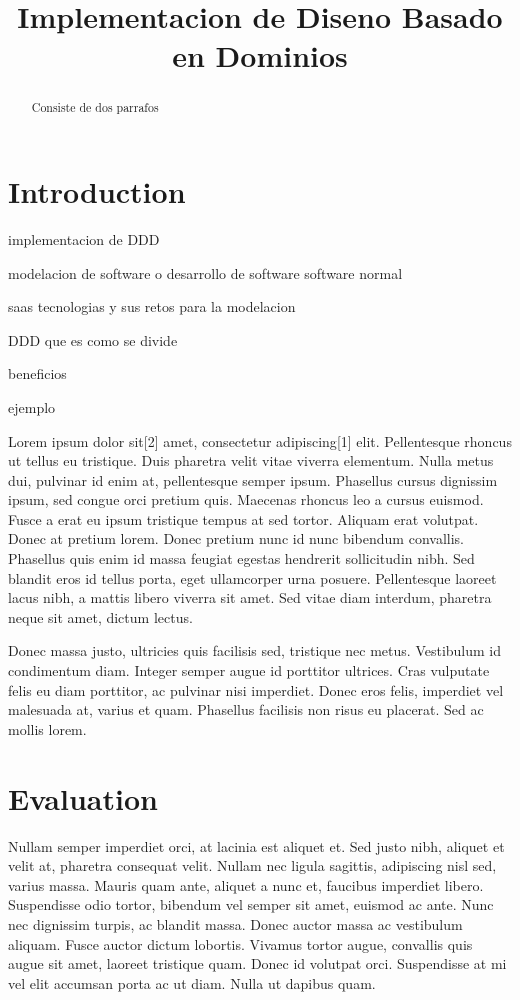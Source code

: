 \documentclass{acm_proc_article-sp}
\title{Implementacion de Diseno Basado en Dominios}
\author{
\alignauthor Christian Eder Gastelum Reyes \\
        \affaddr{Universidad Autonoma de Cuidad Juarez}\\
       \email{\href{mailto:cristian_eder@hotmail.com}{\nolinkurl{cristian\_eder@hotmail.com}}}
\and \alignauthor Ramon Parra Loera \\
        \affaddr{Universidad Autonoma de Cuidad Juarez}\\
       \email{\href{mailto:rparra@uacj.mx}{\nolinkurl{rparra@uacj.mx}}}
\and }
\date{}
\begin{document}
\maketitle

\begin{abstract}
Consiste de dos parrafos
\end{abstract}

\section{Introduction}\label{introduction}

implementacion de DDD

modelacion de software o desarrollo de software software normal

saas tecnologias y sus retos para la modelacion

DDD que es como se divide

beneficios

ejemplo

Lorem ipsum dolor sit{[}2{]} amet, consectetur adipiscing{[}1{]} elit.
Pellentesque rhoncus ut tellus eu tristique. Duis pharetra velit vitae
viverra elementum. Nulla metus dui, pulvinar id enim at, pellentesque
semper ipsum. Phasellus cursus dignissim ipsum, sed congue orci pretium
quis. Maecenas rhoncus leo a cursus euismod. Fusce a erat eu ipsum
tristique tempus at sed tortor. Aliquam erat volutpat. Donec at pretium
lorem. Donec pretium nunc id nunc bibendum convallis. Phasellus quis
enim id massa feugiat egestas hendrerit sollicitudin nibh. Sed blandit
eros id tellus porta, eget ullamcorper urna posuere. Pellentesque
laoreet lacus nibh, a mattis libero viverra sit amet. Sed vitae diam
interdum, pharetra neque sit amet, dictum lectus.

Donec massa justo, ultricies quis facilisis sed, tristique nec metus.
Vestibulum id condimentum diam. Integer semper augue id porttitor
ultrices. Cras vulputate felis eu diam porttitor, ac pulvinar nisi
imperdiet. Donec eros felis, imperdiet vel malesuada at, varius et quam.
Phasellus facilisis non risus eu placerat. Sed ac mollis lorem.

\section{Evaluation}\label{evaluation}

Nullam semper imperdiet orci, at lacinia est aliquet et. Sed justo nibh,
aliquet et velit at, pharetra consequat velit. Nullam nec ligula
sagittis, adipiscing nisl sed, varius massa. Mauris quam ante, aliquet a
nunc et, faucibus imperdiet libero. Suspendisse odio tortor, bibendum
vel semper sit amet, euismod ac ante. Nunc nec dignissim turpis, ac
blandit massa. Donec auctor massa ac vestibulum aliquam. Fusce auctor
dictum lobortis. Vivamus tortor augue, convallis quis augue sit amet,
laoreet tristique quam. Donec id volutpat orci. Suspendisse at mi vel
elit accumsan porta ac ut diam. Nulla ut dapibus quam.
\end{document}
